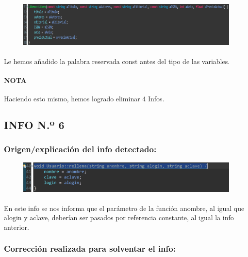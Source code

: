 			\begin{figure}[H]
				\centering
				\includegraphics[scale=0.55]{img/esteban11.png}
				\label{esteban11}
			\end{figure}
		
			\paragraph{}Le hemos añadido la palabra reservada const antes del tipo de las variables.
			
			\paragraph{NOTA}Haciendo esto mismo, hemos logrado eliminar 4 Infos.
			
	\subsection{INFO N.º 6}
	
		\subsubsection{Origen/explicación del info detectado:}
		
			\begin{figure}[H]
				\centering
				\includegraphics[scale=0.55]{img/esteban12.png}
				\label{esteban12}
			\end{figure}
		
			\paragraph{}En este info se nos informa que el parámetro de la función anombre, al igual que alogin y aclave, deberían ser pasados por referencia constante, al igual la info anterior.
			
		\subsubsection{Corrección realizada para solventar el info:}
		
